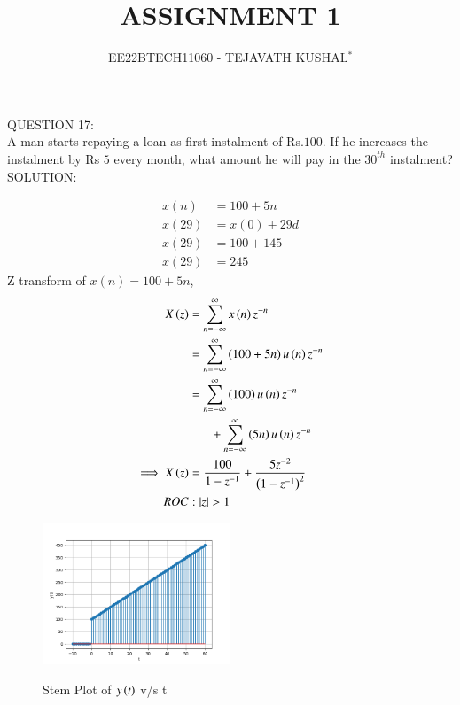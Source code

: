 \documentclass[journal,12pt,twocolumn]{IEEEtran}
\theoremstyle{remark}
\begin{document}

\vspace{3cm}

\title{ASSIGNMENT 1}
\author{EE22BTECH11060 - TEJAVATH KUSHAL$^{*}$%
}
\maketitle
\newpage
\bigskip

\renewcommand{\thefigure}{\theenumi}
\renewcommand{\thetable}{\theenumi}


\maketitle
QUESTION 17:\\
A man starts repaying a loan as first instalment of Rs.$100$. If he increases the
instalment by Rs $5$ every month, what amount he will pay in the $30^{th}$ instalment?\\

SOLUTION:\\
\begin{table}[ht]

\end{table}

\begin{align}
x(n)&= 100 + 5n \\
x(29)&= x(0)+29d \\
x(29)&= 100+ 145 \\
x(29)&= 245
\label{tab:table1}
\end{align}
Z transform of $x(n)= 100 + 5n$,
\begin{align}
X \left(z\right) & = \sum_{n=-\infty}^{\infty} x \left(n\right)   z^{-n} \\
& = \sum_{n=-\infty}^{\infty}  \left(100+5n\right) u \left(n\right)   z^{-n} \\
\notag & = \sum_{n=-\infty}^{\infty} \left(100\right) u \left(n\right)   z^{-n} \\  &~~~~~~~+\sum_{n=-\infty}^{\infty} \left(5n\right) u \left(n\right)  z^{-n} \\
\implies X \left(z\right) & = \frac{100}{1-z^{-1}} + \frac{5z^{-2}}{\left(1-z^{-1}\right)^2} \\
ROC &: \left\vert z\right\vert > 1 \notag
\end{align}


\pagebreak

\begin{figure}[h]
    \includegraphics[width=0.5\textwidth]{figs/y(t)_vs_t.png}\label{fig:stem-plot}
    \caption{Stem Plot of $y\left(t\right)$ v/s t}
\end{figure}
\end{document}
